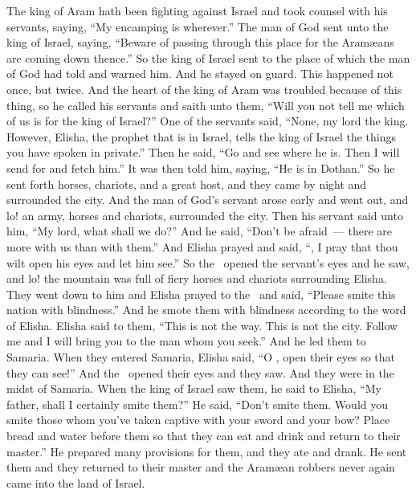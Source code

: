 \begin{inparaenum}
   The king of Aram hath been fighting against Israel and took counsel with his servants, saying, ``My encamping is wherever.''%
   The man of God sent unto the king of Israel, saying, ``Beware of passing through this place for the Aram\ae{}ans are coming down thence.''%
   So the king of Israel sent to the place of which the man of God had told and warned him. And he stayed on guard. This happened not once, but twice.%
   And the heart of the king of Aram was troubled because of this thing, so he called his servants and saith unto them, ``Will you not tell me which of us is for the king of Israel?''%
   One of the servants said, ``None, my lord the king. However, Elisha, the prophet that is in Israel, tells the king of Israel the things you have spoken in private.''%
   Then he said, ``Go and see where he is. Then I will send for and fetch him.'' It was then told him, saying, ``He is in Dothan.''%
   So he sent forth horses, chariots, and a great host, and they came by night and surrounded the city.%
   And the man of God's servant arose early and went out, and lo! an army, horses and chariots, surrounded the city. Then his servant said unto him, ``My lord, what shall we do?''%
   And he said, ``Don't be afraid~--- there are more with us than with them.''%
   And Elisha prayed and said, ``\lord, I pray that thou wilt open his eyes and let him see.'' So the \lord\ opened the servant's eyes and he saw, and lo! the mountain was full of fiery horses and chariots surrounding Elisha.%
   They went down to him and Elisha prayed to the \lord\ and said, ``Please smite this nation with blindness.'' And he smote them with blindness according to the word of Elisha.%
   Elisha said to them, ``This is not the way. This is not the city. Follow me and I will bring you to the man whom you seek.'' And he led them to Samaria.%
   When they entered Samaria, Elisha said, ``O \lord, open their eyes so that they can see!'' And the \lord\ opened their eyes and they saw. And they were in the midst of Samaria.%
   When the king of Israel saw them, he said to Elisha, ``My father, shall I certainly smite them?''%
   He said, ``Don't smite them. Would you smite those whom you've taken captive with your sword and your bow? Place bread and water before them so that they can eat and drink and return to their master.''%
   He prepared many provisions for them, and they ate and drank. He sent them and they returned to their master and the Aram\ae{}an robbers never again came into the land of Israel.%
  

\end{inparaenum}
